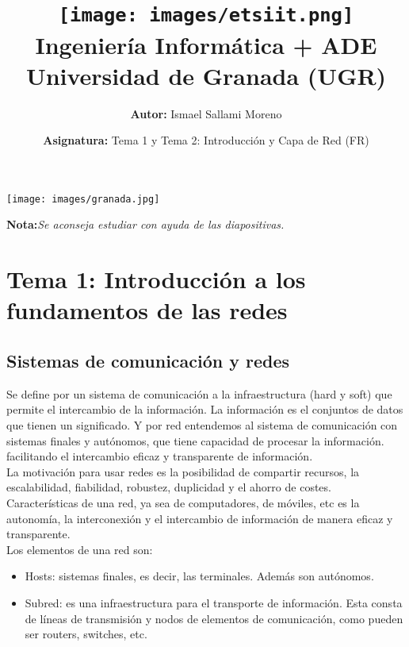 \documentclass[a4paper,12pt]{article}
\title{
    \vspace{-2cm}
    \texttt{[image: images/etsiit.png]} \\ %
    \LARGE Ingeniería Informática + ADE\\
    \large Universidad de Granada (UGR)\\[1cm]
}
\author{\textbf{Autor:} Ismael Sallami Moreno}
\date{\textbf{Asignatura:} Tema 1 y Tema 2: Introducción y Capa de Red (FR)\\[1cm]}
\begin{document}
\maketitle
\thispagestyle{empty}

\begin{center}
    \texttt{[image: images/granada.jpg]} \\ %
    \vfill
\end{center}

\newpage

\tableofcontents
\newpage

\textbf{Nota:}\textit{Se aconseja estudiar con ayuda de las diapositivas.}

\section{Tema 1: Introducción a los fundamentos de las redes}

\subsection{Sistemas de comunicación y redes}

Se define por un sistema de comunicación  a la infraestructura (hard y soft) que permite el intercambio de la información. La información es el conjuntos de datos que tienen un significado. Y por red entendemos al sistema de comunicación con sistemas finales y autónomos, que tiene capacidad de procesar la información. facilitando el intercambio eficaz y transparente de información.\\

La motivación para usar redes es la posibilidad de compartir recursos, la escalabilidad, fiabilidad, robustez, duplicidad y el ahorro de costes.\\

Características de una red, ya sea de computadores, de móviles, etc es la autonomía, la interconexión y el intercambio de información de manera eficaz y transparente.\\

Los elementos de una red son:
\begin{itemize}
    \item Hosts: sistemas finales, es decir, las terminales. Además son autónomos.
    \item Subred: es una infraestructura para el transporte de información. Esta consta de líneas de transmisión y nodos de elementos de comunicación, como pueden ser routers, switches, etc.
\end{itemize}
\end{document}
